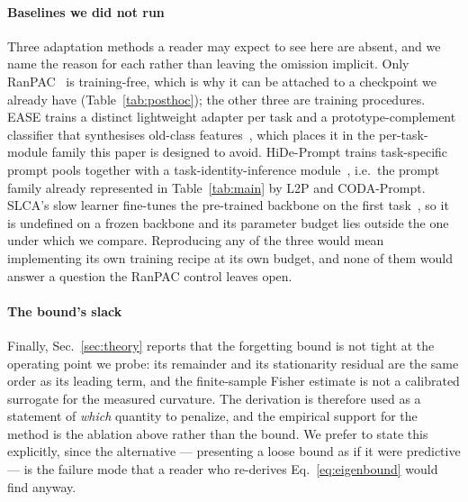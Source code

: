 \paragraph{Baselines we did not run}
Three adaptation methods a reader may expect to see here are absent, and we name the reason
for each rather than leaving the omission implicit. Only RanPAC~\cite{mcdonnell2023ranpac} is
training-free, which is why it can be attached to a checkpoint we already have
(Table~\ref{tab:posthoc}); the other three are training procedures. EASE trains a distinct
lightweight adapter per task and a prototype-complement classifier that synthesises old-class
features~\cite{zhou2024ease}, which places it in the per-task-module family this paper is
designed to avoid. HiDe-Prompt trains task-specific prompt pools together with a
task-identity-inference module~\cite{wang2023hideprompt}, i.e.\ the prompt family already
represented in Table~\ref{tab:main} by L2P and CODA-Prompt. SLCA's slow learner fine-tunes the
pre-trained backbone on the first task~\cite{zhang2023slca}, so it is undefined on a frozen
backbone and its parameter budget lies outside the one under which we compare. Reproducing any
of the three would mean implementing its own training recipe at its own budget, and none of them
would answer a question the RanPAC control leaves open.

\paragraph{The bound's slack}
Finally, Sec.~\ref{sec:theory} reports that the forgetting bound is not tight at the
operating point we probe: its remainder and its stationarity residual are the same order as
its leading term, and the finite-sample Fisher estimate is not a calibrated surrogate for
the measured curvature. The derivation is therefore used as a statement of \emph{which}
quantity to penalize, and the empirical support for the method is the ablation above rather
than the bound. We prefer to state this explicitly, since the alternative --- presenting a
loose bound as if it were predictive --- is the failure mode that a reader who re-derives
Eq.~\eqref{eq:eigenbound} would find anyway.

